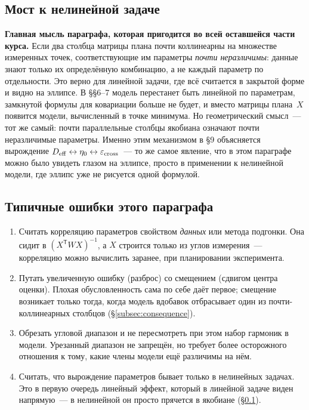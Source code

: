 \subsection{Мост к нелинейной задаче}
\label{subsec:bridge}

\begin{tcolorbox}[enhanced,colback=cS1!7,colframe=cS1,boxrule=0pt,leftrule=3pt,arc=1pt]
\textbf{Главная мысль параграфа, которая пригодится во всей оставшейся части курса.} Если два
столбца матрицы плана почти коллинеарны на множестве измеренных точек, соответствующие им
параметры \emph{почти неразличимы}: данные знают только их определённую комбинацию, а не каждый
параметр по отдельности. Это верно для линейной задачи, где всё считается в закрытой форме и
видно на эллипсе. В §§6--7 модель перестанет быть линейной по параметрам, замкнутой формулы для
ковариации больше не будет, и вместо матрицы плана~$X$ появится  модели,
вычисленный в точке минимума. Но геометрический смысл~--- тот же самый: почти параллельные
столбцы якобиана означают почти неразличимые параметры. Именно этим механизмом в §9 объясняется
вырождение $D_{\mathrm{eff}}\leftrightarrow\eta_0\leftrightarrow\varepsilon_{\rm cross}$~--- то же самое
явление, что в этом параграфе можно было увидеть глазом на эллипсе, просто в применении к
нелинейной модели, где эллипс уже не рисуется одной формулой.
\end{tcolorbox}

\subsection{Типичные ошибки этого параграфа}

\begin{enumerate}[leftmargin=1.6em,itemsep=0.25em]
  \item Считать корреляцию параметров свойством \emph{данных} или метода подгонки. Она сидит в
        $(X^{\mathsf T}WX)^{-1}$, а $X$ строится только из углов измерения~--- корреляцию можно
        вычислить заранее, при планировании эксперимента.
  \item Путать увеличенную ошибку (разброс) со смещением (сдвигом центра оценки). Плохая
        обусловленность сама по себе даёт первое; смещение возникает только тогда, когда модель
        вдобавок отбрасывает один из почти-коллинеарных столбцов (§\ref{subsec:consequence}).
  \item Обрезать угловой диапазон и не пересмотреть при этом набор гармоник в модели. Урезанный
        диапазон не запрещён, но требует более осторожного отношения к тому, какие члены модели
        ещё различимы на нём.
  \item Считать, что вырождение параметров бывает только в нелинейных задачах. Это в первую
        очередь линейный эффект, который в линейной задаче виден напрямую~--- в нелинейной он
        просто прячется в якобиане (§\ref{subsec:bridge}).
\end{enumerate}

\clearpage
